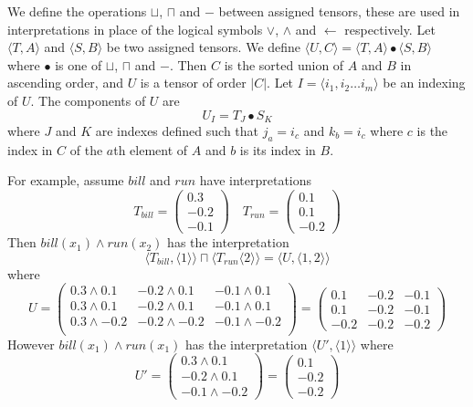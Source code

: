 \documentclass{article}
\begin{document}
We define the operations $\sqcup$, $\sqcap$ and $-$ between assigned
tensors, these are used in interpretations in place of the logical
symbols $\lor$, $\land$ and $\leftarrow$ respectively. Let $\langle T,
A\rangle$ and $\langle S, B\rangle$ be two assigned tensors. We define
$\langle U, C\rangle = \langle T, A\rangle \bullet \langle S,
B\rangle$ where $\bullet$ is one of $\sqcup$, $\sqcap$ and $-$. Then
$C$ is the sorted union of $A$ and $B$ in ascending order, and $U$ is
a tensor of order $|C|$. Let $I = \langle i_1, i_2 \ldots i_m\rangle$
be an indexing of $U$. The components of $U$ are
$$ U_I = T_J \bullet S_K$$
where $J$ and $K$ are indexes defined such that $j_a = i_c$ and $k_b =
i_c$ where $c$ is the index in $C$ of the $a$th element of $A$ and $b$
is its index in $B$.

For example, assume $\mathit{bill}$ and $\mathit{run}$ have
interpretations
$$T_{\mathit{bill}} = \left( \begin{array}{r}
0.3 \\
-0.2 \\
-0.1
\end{array}\right) \quad T_{\mathit{run}} = \left( \begin{array}{r}
0.1 \\
0.1 \\
-0.2
\end{array}\right)$$
Then $\mathit{bill}(x_1)\land\mathit{run}(x_2)$ has
the interpretation
$$\langle T_{\mathit{bill}}, \langle 1\rangle\rangle \sqcap \langle
  T_{\mathit{run}} \langle 2\rangle\rangle = \langle U, \langle 1, 2\rangle\rangle$$
where
$$U = \left( \begin{array}{rrr}
0.3\land 0.1 & -0.2\land 0.1 & -0.1\land 0.1 \\
0.3\land 0.1 & -0.2\land 0.1 & -0.1\land 0.1 \\
0.3\land -0.2 & -0.2\land -0.2 & -0.1\land -0.2 \\
\end{array} \right) = \left( \begin{array}{rrr}
0.1 & -0.2 & -0.1 \\
0.1 & -0.2 & -0.1 \\
-0.2 & -0.2 & -0.2 \end{array} \right)$$
However $\mathit{bill}(x_1)\land\mathit{run}(x_1)$ has
the interpretation $\langle U',\langle 1\rangle\rangle$ where
$$U' =  \left( \begin{array}{r}
0.3 \land 0.1\\
-0.2 \land 0.1 \\
-0.1 \land -0.2
\end{array}\right) =  \left( \begin{array}{r}
0.1 \\
-0.2 \\
-0.2
\end{array}\right) $$




\end{document}
